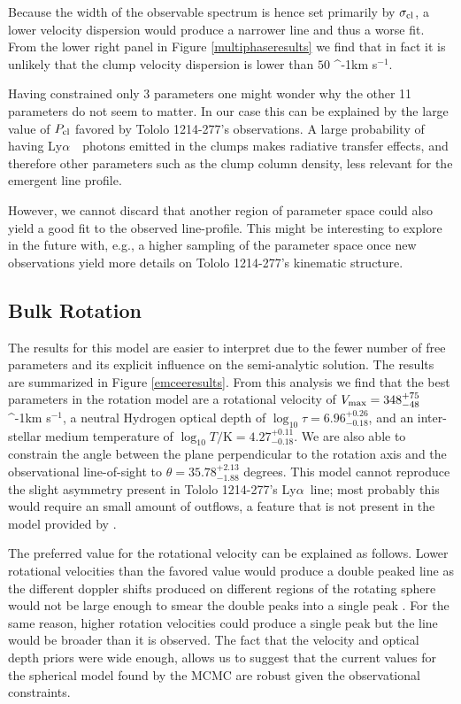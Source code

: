 \documentclass[a4paper,fleqn,usenatbib]{mnras}
\newcommand{\tol}{Tololo 1214-277}
\newcommand{\lya}{\ifmmode{{\rm Ly}\alpha}\else Ly$\alpha$\ \fi}
\newcommand{\kms}{\ifmmode\mathrm{km\ s}^{-1}\else km s$^{-1}$\fi}
\begin{document}
Because the width of the observable spectrum is hence set primarily by
$\sigma_{\rm cl}$, a lower velocity dispersion would produce a
narrower line and thus a worse fit. 
From the lower right panel in Figure \ref{multiphaseresults} we find
that in fact it is unlikely that the clump velocity dispersion is
lower than $50$ \kms. 

Having constrained only 3 parameters one might wonder why the other 11
parameters do not seem to matter.
In our case this can be explained by the large value of $P_{\rm cl}$
favored by \tol's observations. 
A large probability of having \lya\ photons emitted in the clumps
makes radiative transfer effects, and therefore other parameters such
as the clump column density, less relevant for the emergent line
profile. 


However, we cannot discard that another region of parameter space
could also yield a good fit to the observed line-profile.
This might be interesting to explore in the
future with, e.g., a higher sampling of the parameter space once new 
observations  yield more details on \tol's kinematic structure. 

\subsection{Bulk Rotation}

The results for this model are easier to interpret due to the fewer
number of free parameters and its explicit influence on the
semi-analytic solution.
The results are summarized in  Figure \ref{emceeresults}. 
From this analysis we find that the best parameters in the rotation
model are a rotational velocity of  $V_{\rm max}=348^{+75}_{-48}$
\kms, a neutral Hydrogen optical depth of
$\log_{10}\tau=6.96^{+0.26}_{-0.18}$,  and an inter-stellar medium
temperature of $\log_{10} T/\mathrm {K} = 4.27^{+0.11}_{-0.18}$.   
We are also able to constrain the angle between the plane
perpendicular to the rotation axis and the observational line-of-sight
to $\theta = 35.78^{+2.13}_{-1.88}$ degrees.
This model cannot reproduce the slight asymmetry present in \tol's
\lya line; most probably this would require an small amount of
outflows, a feature that is not present in the model provided by
\cite{GaravitoCamargo2014}. 

The preferred value for the rotational velocity can be explained as
follows. 
Lower rotational velocities than the favored value would produce a
double peaked line as the different doppler shifts produced on
different regions of the rotating sphere would not be large enough to
smear the double peaks into a single peak
\citep{GaravitoCamargo2014}. 
For the same reason, higher rotation velocities could produce a single
peak but the line would be broader than it is observed.
The fact that the velocity and optical depth priors were wide enough,
allows us to suggest that the current values for the spherical model
found by the MCMC are robust given the observational constraints.
\end{document}
